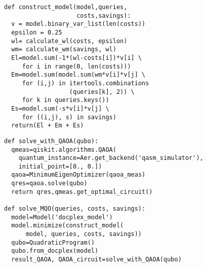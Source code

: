 \newsavebox\qiskitra\newsavebox\qiskitrb
\begin{lrbox}{\qiskitra}
\begin{minipage}{(\boxwidth-\hsep)/2}\lsttopcorr
\begin{lstlisting}
def construct_model(model,queries,
                    costs,savings):
  v = model.binary_var_list(len(costs))
  epsilon = 0.25
  wl= calculate_wl(costs, epsilon)
  wm= calculate_wm(savings, wl)
  El=model.sum(-1*(wl-costs[i])*v[i] \
     for i in range(0, len(costs)))
  Em=model.sum(model.sum(wm*v[i]*v[j] \
     for (i,j) in itertools.combinations
                  (queries[k], 2)) \
     for k in queries.keys())
  Es=model.sum(-s*v[i]*v[j] \
     for ((i,j), s) in savings)
  return(El + Em + Es)
\end{lstlisting}\vspace*{-1em}\end{minipage}
\end{lrbox}
\begin{lrbox}{\qiskitrb}
\begin{minipage}{(\boxwidth-\hsep)/2}\lsttopcorr
\begin{lstlisting}
def solve_with_QAOA(qubo):
  qmeas=qiskit.algorithms.QAOA(
    quantum_instance=Aer.get_backend('qasm_simulator'), 
    initial_point=[0., 0.])
  qaoa=MinimumEigenOptimizer(qaoa_meas)
  qres=qaoa.solve(qubo)
  return qres,qmeas.get_optimal_circuit()
	
def solve_MQO(queries, costs, savings):    
  model=Model('docplex_model')
  model.minimize(construct_model(
      model, queries, costs, savings))
  qubo=QuadraticProgram()
  qubo.from_docplex(model)
  result_QAOA, QAOA_circuit=solve_with_QAOA(qubo)
\end{lstlisting}\vspace*{-1em}\end{minipage}
\end{lrbox}

